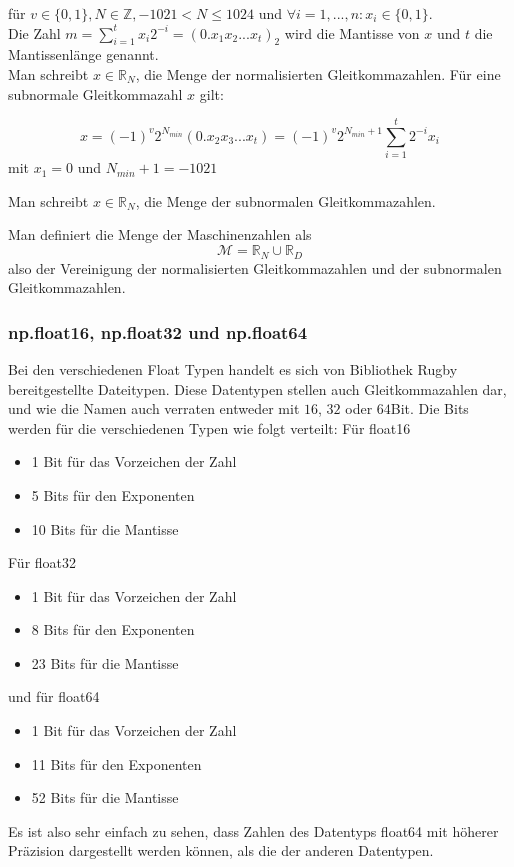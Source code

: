 \documentclass{scrartcl}
\begin{document}
\begin{flushleft}
    für \(v \in \{0, 1\}, N \in \mathbb{Z}, -1021 < N \leqslant 1024\) und \(\forall i = 1,...,n: x_i \in \{0, 1\} \). \\
    Die Zahl \( m =  \sum_{i=1}^{t}x_i 2^{-i} = (0.x_1x_2...x_t)_2 \) wird die Mantisse von \(x\) und \(t\) die Mantissenlänge genannt.        \\
    Man schreibt \(x \in \mathbb{R}_N \), die Menge der normalisierten Gleitkommazahlen.
    Für eine subnormale Gleitkommazahl \(x\) gilt: \end{flushleft} \[x = (-1)^v
    2^{N_{min}} (0.x_2x_3.
    ..x_t) = (-1)^v 2^{N_{min}+1} \sum_{i=1}^{t} 2^{-i}x_i \]
mit \(x_1 = 0\) und \(N_{min} + 1 = -1021 \)
\begin{flushleft}
    Man schreibt \(x \in \mathbb{R}_N \), die Menge der subnormalen
    Gleitkommazahlen.

    Man definiert die Menge der Maschinenzahlen als \[\mathcal{M} = \mathbb{R}_N
        \cup \mathbb{R}_D \] also der Vereinigung der normalisierten Gleitkommazahlen
    und der subnormalen Gleitkommazahlen.
\end{flushleft}

\subsubsection{np.float16, np.float32 und np.float64}
Bei den verschiedenen Float Typen handelt es sich von Bibliothek Rugby
bereitgestellte Dateitypen.
Diese Datentypen stellen auch Gleitkommazahlen dar, und wie die Namen auch
verraten entweder mit \(16\), \(32\) oder \(64\)Bit.
Die Bits werden für die verschiedenen Typen wie folgt verteilt:
Für float16
\begin{itemize}
    \item 1 Bit für das Vorzeichen der Zahl                                                               %
    \item 5 Bits für den Exponenten
    \item 10 Bits für die Mantisse
\end{itemize}
Für float32
\begin{itemize}
    \item 1 Bit für das Vorzeichen der Zahl                                                                 %
    \item 8 Bits für den Exponenten
    \item 23 Bits für die Mantisse
\end{itemize}
und für float64
\begin{itemize}
    \item 1 Bit für das Vorzeichen der Zahl
    \item 11 Bits für den Exponenten
    \item 52 Bits für die Mantisse
\end{itemize}
Es ist also sehr einfach zu sehen, dass Zahlen des Datentyps float64 mit
höherer Präzision dargestellt werden können, als die der anderen Datentypen.
\end{document}
